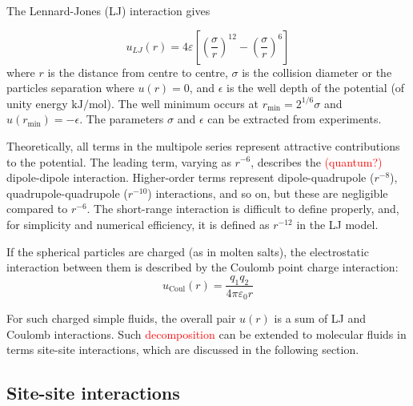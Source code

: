 The Lennard-Jones (LJ) interaction gives

\begin{equation}
u_{LJ}(r)=4\varepsilon\left[\left(\frac{\sigma}{r}\right)^{12}-\left(\frac{\sigma}{r}\right)^{6}\right]
\end{equation}
where $r$ is the distance from centre to centre, $\sigma$ is the
collision diameter or the particles separation where $u(r)=0$, and
$\epsilon$ is the well depth of the potential (of unity energy $\mathrm{kJ/mol}$).
The well minimum occurs at $r_{\min}=2^{1/6}\sigma$ and $u(r_{\min})=-\epsilon$.
The parameters $\sigma$ and $\epsilon$ can be extracted from experiments.

Theoretically, all terms in the multipole series represent attractive
contributions to the potential. The leading term, varying as $r^{-6}$,
describes the \textcolor{red}{(quantum?)} dipole-dipole interaction.
Higher-order terms represent dipole-quadrupole ($r^{-8}$), quadrupole-quadrupole
($r^{-10}$) interactions, and so on, but these are negligible compared
to $r^{-6}$. The short-range interaction is difficult to define properly,
and, for simplicity and numerical efficiency, it is defined as $r^{-12}$
in the LJ model. 

If the spherical particles are charged (as in molten salts), the electrostatic
interaction between them is described by the Coulomb point charge
interaction:
\begin{equation}
u_{\mathrm{Coul}}(r)=\frac{q_{1}q_{2}}{4\pi\varepsilon_{0}r}
\end{equation}

For such charged simple fluids, the overall pair $u(r)$ is a sum
of LJ and Coulomb interactions. Such \textcolor{red}{decomposition}
can be extended to molecular fluids in terms site-site interactions,
which are discussed in the following section.

\subsection{Site-site interactions}

